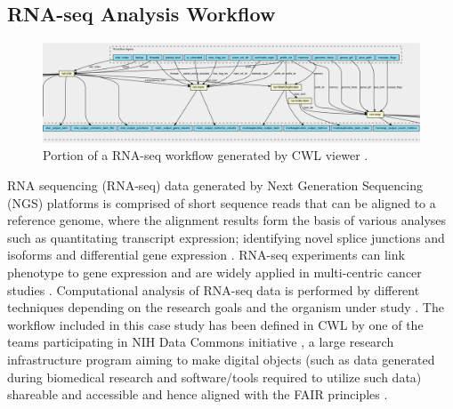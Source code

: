 \documentclass[a4paper,num-refs]{oup-contemporary}
\begin{document}
\subsection{RNA-seq Analysis Workflow} \label{sec:rnaseq-wf}
\begin{figure} [t!] 
\centering
\includegraphics[width=\textwidth]{images/rnaseq-cwlviewer-half.png}
\captionsetup{justification=centering}
\caption{Portion of a RNA-seq workflow generated by CWL viewer \citep{robinson_2017}.}\label{fig:rna-seq}
\end{figure}
RNA sequencing (RNA-seq) data generated by Next Generation Sequencing (NGS) platforms is comprised of short sequence reads that can be aligned to a reference genome, where the alignment results form the basis of various analyses such as quantitating transcript expression; identifying novel splice junctions and isoforms and differential gene expression \citep{dobin2015mapping}. RNA-seq experiments can link phenotype to gene expression and are widely applied in multi-centric cancer studies \citep{cohen2017scientific}. Computational analysis of RNA-seq data is performed by different techniques depending on the research goals and the organism under study \citep{Conesa2016}. The workflow \citep{rnaseq} included in this case study has been defined in CWL by one of the teams \citep{heliumda} participating in NIH Data Commons initiative \citep{DataComm86}, a large research infrastructure program aiming to make digital objects (such as data generated during biomedical research and software/tools required to utilize such data) shareable and accessible and hence aligned with the FAIR principles \citep{wilkinson_2016}. 
\end{document}

